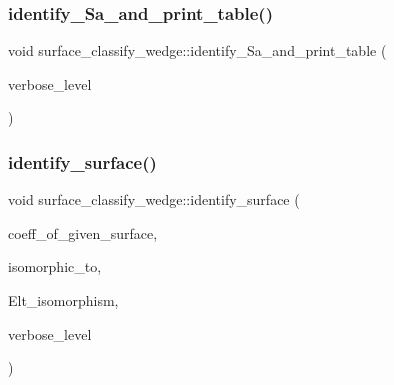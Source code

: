 \mbox{\label{classsurface__classify__wedge_ab6f123417bdb3f9c817082ca1b2e9e38}} 
\subsubsection{\texorpdfstring{identify\+\_\+\+Sa\+\_\+and\+\_\+print\+\_\+table()}{identify\_Sa\_and\_print\_table()}}
{\footnotesize\ttfamily void surface\+\_\+classify\+\_\+wedge\+::identify\+\_\+\+Sa\+\_\+and\+\_\+print\+\_\+table (\begin{DoxyParamCaption}\item[{\mbox{\hyperlink{galois_8h_a09fddde158a3a20bd2dcadb609de11dc}{I\+NT}}}]{verbose\+\_\+level }\end{DoxyParamCaption})}

\mbox{\label{classsurface__classify__wedge_a0ee820a0324434792bd5362b4606de80}} 
\subsubsection{\texorpdfstring{identify\+\_\+surface()}{identify\_surface()}}
{\footnotesize\ttfamily void surface\+\_\+classify\+\_\+wedge\+::identify\+\_\+surface (\begin{DoxyParamCaption}\item[{\mbox{\hyperlink{galois_8h_a09fddde158a3a20bd2dcadb609de11dc}{I\+NT}} $\ast$}]{coeff\+\_\+of\+\_\+given\+\_\+surface,  }\item[{\mbox{\hyperlink{galois_8h_a09fddde158a3a20bd2dcadb609de11dc}{I\+NT}} \&}]{isomorphic\+\_\+to,  }\item[{\mbox{\hyperlink{galois_8h_a09fddde158a3a20bd2dcadb609de11dc}{I\+NT}} $\ast$}]{Elt\+\_\+isomorphism,  }\item[{\mbox{\hyperlink{galois_8h_a09fddde158a3a20bd2dcadb609de11dc}{I\+NT}}}]{verbose\+\_\+level }\end{DoxyParamCaption})}

